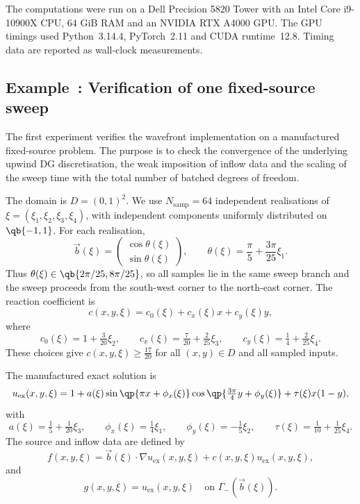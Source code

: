 \documentclass[final]{amsart}
\newcounter{numexample}
\newcommand{\CurrentExample}{Example~\thenumexample}
\newcommand{\ExampleSubsection}[2]{%
  \refstepcounter{numexample}%
  \label{#2-exno}%
  \subsection{\CurrentExample: #1}%
  \label{#2}%
}
\begin{document}
The computations were run on a Dell Precision 5820 Tower with an Intel
Core i9-10900X CPU, $64$ GiB RAM and an NVIDIA RTX A4000 GPU. The GPU
timings used Python~3.14.4, PyTorch~2.11 and CUDA
runtime~12.8.  Timing data are reported as wall-clock
measurements. 

\ExampleSubsection{Verification of one fixed-source sweep}
{subsec:equivalence_convergence}

The first experiment verifies the wavefront implementation on a
manufactured fixed-source problem. The purpose is to check the
convergence of the underlying upwind DG discretisation, the weak
imposition of inflow data and the scaling of the sweep time with the
total number of batched degrees of freedom.

The domain is $D=(0,1)^2$. We use $N_{\mathrm{samp}}=64$ independent
realisations of
$\xi=(\xi_1,\xi_2,\xi_3,\xi_4)$, with independent components uniformly
distributed on $\qb{-1,1}$. For each realisation,
\begin{equation}
\vec b(\xi)
=
\begin{pmatrix}
\cos{\theta(\xi)}\\
\sin{\theta(\xi)}
\end{pmatrix},
\qquad
\theta(\xi)=\frac{\pi}{5}+\frac{3\pi}{25}\xi_1.
\label{eq:ex1_transport_field}
\end{equation}
Thus $\theta(\xi)\in\qb{2\pi/25,8\pi/25}$, so all samples lie in the same
sweep branch and the sweep proceeds from the south-west corner to the
north-east corner. The reaction coefficient is
\begin{equation}
c(x,y,\xi)
=
c_0(\xi)+c_x(\xi)x+c_y(\xi)y,
\label{eq:ex1_reaction}
\end{equation}
where
\begin{equation}
c_0(\xi)=1+\tfrac{3}{20}\xi_2,
\qquad
c_x(\xi)=\tfrac{7}{20}+\tfrac{2}{25}\xi_3,
\qquad
c_y(\xi)=\tfrac{1}{4}+\tfrac{2}{25}\xi_4.
\end{equation}
These choices give $c(x,y,\xi)\geq\tfrac{17}{20}$ for all
$(x,y)\in D$ and all sampled inputs.

The manufactured exact solution is
\begin{equation}
u_{\mathrm{ex}}(x,y,\xi)
=
1
+
a(\xi)
\sin{\qp{\pi x+\phi_x(\xi)}}
\cos{\qp{\tfrac{3\pi}{4}y+\phi_y(\xi)}}
+
\tau(\xi)x(1-y),
\label{eq:ex1_exact_solution}
\end{equation}
with
\begin{equation}
a(\xi)=\tfrac{1}{5}+\tfrac{1}{20}\xi_3,
\qquad
\phi_x(\xi)=\tfrac{1}{4}\xi_1,
\qquad
\phi_y(\xi)=-\tfrac{1}{5}\xi_2,
\qquad
\tau(\xi)=\tfrac{1}{10}+\tfrac{1}{25}\xi_4.
\end{equation}
The source and inflow data are defined by
\begin{equation}
f(x,y,\xi)
=
\vec b(\xi)\cdot \nabla u_{\mathrm{ex}}(x,y,\xi)
+
c(x,y,\xi)u_{\mathrm{ex}}(x,y,\xi),
\label{eq:ex1_source}
\end{equation}
and
\begin{equation}
g(x,y,\xi)=u_{\mathrm{ex}}(x,y,\xi)
\quad \text{on } \Gamma_-(\vec b(\xi)).
\label{eq:ex1_inflow}
\end{equation}
\end{document}
